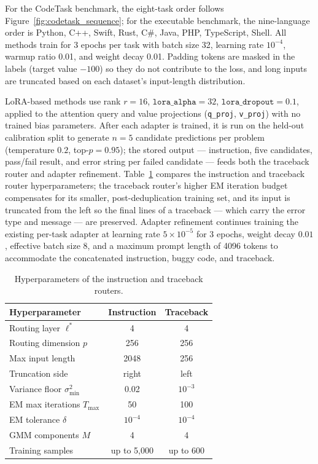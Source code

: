 For the CodeTask benchmark, the eight-task order follows Figure~\ref{fig:codetask_sequence}; for the executable benchmark, the nine-language order is Python, C++, Swift, Rust, C\#, Java, PHP, TypeScript, Shell. All methods train for 3 epochs per task with batch size 32, learning rate $10^{-4}$, warmup ratio 0.01, and weight decay 0.01. Padding tokens are masked in the labels (target value $-100$) so they do not contribute to the loss, and long inputs are truncated based on each dataset's input-length distribution.

LoRA-based methods use rank $r=16$, $\mathtt{lora\_alpha}=32$, $\mathtt{lora\_dropout}=0.1$, applied to the attention query and value projections (\texttt{q\_proj}, \texttt{v\_proj}) with no trained bias parameters. After each adapter is trained, it is run on the held-out calibration split to generate $n=5$ candidate predictions per problem (temperature $0.2$, top-$p=0.95$); the stored output --- instruction, five candidates, pass/fail result, and error string per failed candidate --- feeds both the traceback router and adapter refinement. Table~\ref{tab:router_comparison} compares the instruction and traceback router hyperparameters; the traceback router's higher EM iteration budget compensates for its smaller, post-deduplication training set, and its input is truncated from the left so the final lines of a traceback --- which carry the error type and message --- are preserved. Adapter refinement continues training the existing per-task adapter at learning rate $5\times10^{-5}$ for 3 epochs, weight decay $0.01$, effective batch size 8, and a maximum prompt length of 4096 tokens to accommodate the concatenated instruction, buggy code, and traceback.

\begin{table}[t]
\centering
\caption{Hyperparameters of the instruction and traceback routers.}
\label{tab:router_comparison}
\small
\begin{tabular}{lcc}
\toprule
Hyperparameter & Instruction & Traceback \\
\midrule
Routing layer $\ell^*$ & 4 & 4 \\
Routing dimension $p$ & 256 & 256 \\
Max input length & 2048 & 256 \\
Truncation side & right & left \\
Variance floor $\sigma^2_{\min}$ & 0.02 & $10^{-3}$ \\
EM max iterations $T_{\max}$ & 50 & 100 \\
EM tolerance $\delta$ & $10^{-4}$ & $10^{-4}$ \\
GMM components $M$ & 4 & 4 \\
Training samples & up to 5{,}000 & up to 600 \\
\bottomrule
\end{tabular}
\end{table}

